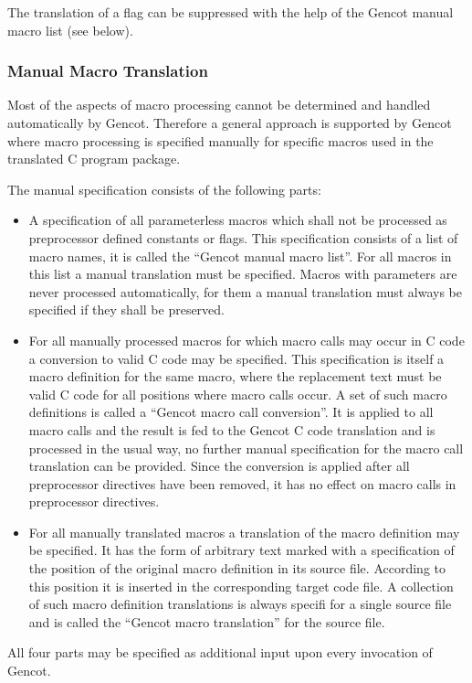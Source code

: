 The translation of a flag can be suppressed with the help of the Gencot manual macro list (see below).

\subsubsection{Manual Macro Translation}

Most of the aspects of macro processing cannot be determined and handled automatically by Gencot. Therefore a
general approach is supported by Gencot where macro processing is specified manually for specific macros used in the
translated C program package.

The manual specification consists of the following parts:
\begin{itemize}
\item A specification of all parameterless macros which shall not be processed as preprocessor defined
constants or flags. This specification consists of a list of macro names, it is called the ``Gencot manual macro list''.
For all macros in this list a manual translation must be specified. Macros with parameters are never 
processed automatically, for them a manual translation must always be specified if they shall be preserved.
\item For all manually processed macros for which macro calls may occur in C code a conversion to valid C 
code may be specified.
This specification is itself a macro definition for the same macro, where the replacement text must be valid
C code for all positions where macro calls occur. A set of such macro definitions is called a ``Gencot macro 
call conversion''. It is applied to all macro calls and the result is fed to 
the Gencot C code translation and is processed in the usual way, no further manual specification for the macro call
translation can be provided. Since the conversion is applied after all preprocessor directives have been
removed, it has no effect on macro calls in preprocessor directives. 
\item For all manually translated macros a translation of the macro definition may be specified. It has the form 
of arbitrary text marked with a specification of the position of the original macro definition in its source file.
According to this position it is inserted in the corresponding target code file. A collection of such macro 
definition translations is always specifi for a single source file and is called the ``Gencot macro translation''
for the source file.
\end{itemize}
All four parts may be specified as additional input upon every invocation of Gencot.

